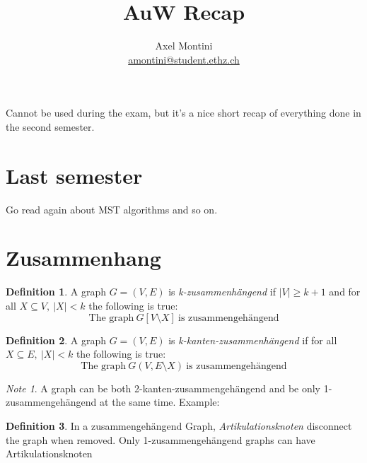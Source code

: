 \documentclass[12pt]{extarticle}
\title{AuW Recap}
\author{
    Axel Montini
    \\
    \href{mailto:amontini@student.ethz.ch}{amontini@student.ethz.ch}
}
\theoremstyle{definition}
\newtheorem{definition}{Definition}
\theoremstyle{remark}
\newtheorem{note}{Note}
\theoremstyle{plain}
\begin{document}
\maketitle

Cannot be used during the exam, but it's a nice short recap of everything done in the second semester.

\section{Last semester}
Go read again about MST algorithms and so on.

\section{Zusammenhang}
\begin{definition}
    A graph $G=(V,E)$ is \textit{k-zusammenhängend} if $|V| \ge k + 1$ and
    for all $X \subseteq V,\ |X| < k$ the following is true:
    \[ \mbox{The graph}\ G[V \setminus X]\ \mbox{is zusammengehängend} \]
\end{definition}

\begin{definition}
    A graph $G=(V,E)$ is \textit{k-kanten-zusammenhängend} if
    for all $X \subseteq E,\ |X| < k$ the following is true:
    \[ \mbox{The graph}\ G(V, E \setminus X)\ \mbox{is zusammengehängend} \]
\end{definition}

\begin{note}
    A graph can be both 2-kanten-zusammengehängend and be only 1-zusammengehängend at the same time.
    Example:
    \begin{figure}[H]
        \centering

    \end{figure}
\end{note}

\begin{definition}
    In a zusammengehängend Graph,
    \textit{Artikulationsknoten} disconnect the graph when removed.
    Only 1-zusammengehängend graphs can have Artikulationsknoten
\end{definition}
\end{document}
